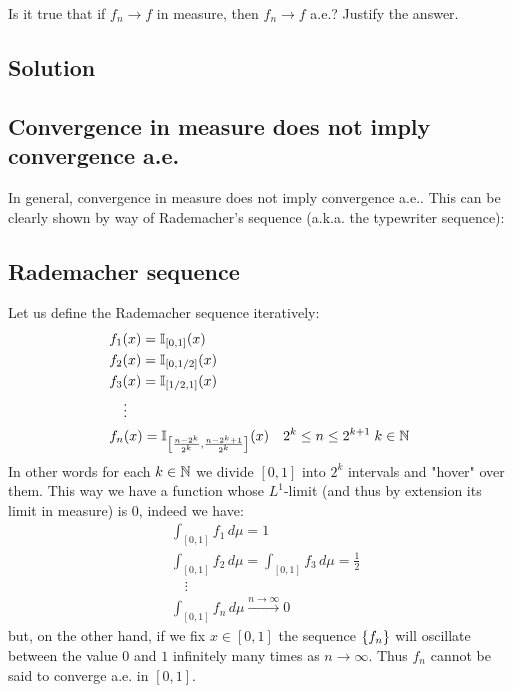 \sheet


\question
Is it true that if $f_n \to f$ in measure, then $f_n \to f$ a.e.? Justify the answer.

\subsection*{Solution}

\subsection{Convergence in measure does not imply convergence a.e.}
In general, convergence in measure does not imply convergence a.e.. This can be clearly shown by way of Rademacher's sequence (a.k.a. the typewriter sequence):

\subsection{Rademacher sequence}
Let us define the Rademacher sequence iteratively:
\begin{align*}
    & f_1(x) = \mathbb{I}_{[0,1]}(x) \\
    & f_2(x) = \mathbb{I}_{[0,1/2]}(x) \\
    & f_3(x) = \mathbb{I}_{[1/2,1]} (x)\\
    & \quad \vdots \\
    & f_n(x) = \mathbb{I}_{\left[\frac{n-2^k}{2^k}, \frac{n-2^{k}+1}{2^k}\right]}(x) \quad 2^k \leq n \leq 2^{k+1} \; k \in \mathbb{N}
\end{align*}
In other words for each $k\in\mathbb{N}$ we divide $[0,1]$ into $2^k$ intervals and "hover" over them.
This way we have a function whose $L^1$-limit (and thus by extension its limit in measure) is $0$, indeed we have:
\begin{align*}
    & \int_{[0,1]} f_1 \, d\mu = 1 \\
    & \int_{[0,1]} f_2 \, d\mu = \int_{[0,1]} f_3 \, d\mu = \frac{1}{2} \\
    & \quad \vdots \\
    & \int_{[0,1]} f_n \, d\mu \xrightarrow{n\to\infty} 0
\end{align*}
but, on the other hand, if we fix $x\in [0,1]$ the sequence $\{ f_n \}$ will oscillate between the value $0$ and $1$ infinitely many times as $n\to\infty$. Thus $f_n$ cannot be said to converge a.e. in $[0,1]$. 


